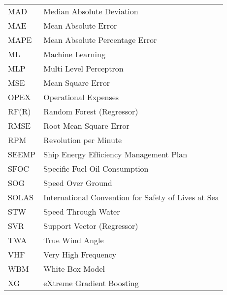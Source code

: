 \begin{longtable}[l]{>{}l<{}l}
MAD         & Median Absolute Deviation \\%
MAE         & Mean Absolute Error \\%
MAPE        & Mean Absolute Percentage Error \\%
ML          & Machine Learning\\%
MLP         & Multi Level Perceptron\\%
MSE         & Mean Square Error\\%
OPEX        & Operational Expenses\\%
RF(R)       & Random Forest (Regressor)\\%
RMSE        & Root Mean Square Error\\%
RPM         & Revolution per Minute\\%
SEEMP       & Ship Energy Efﬁciency Management Plan\\%
SFOC        & Specific Fuel Oil Consumption \\%
SOG         & Speed Over Ground \\%
SOLAS       & International Convention for Safety of Lives at Sea\\%
STW         & Speed Through Water \\%
SVR         & Support Vector (Regressor)\\%
TWA         & True Wind Angle\\%
VHF         & Very High Frequency\\%
WBM         & White Box Model\\%
XG          & eXtreme Gradient Boosting\\%

\end{longtable}

\setlength{\extrarowheight}{0pt}